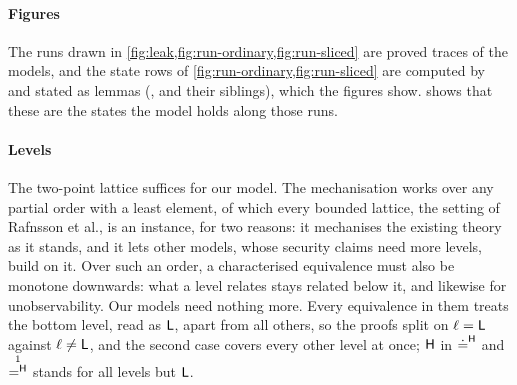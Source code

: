 \paragraph{Figures} The runs drawn in \cref{fig:leak,fig:run-ordinary,fig:run-sliced}
are proved traces of the models, and the state rows of
\cref{fig:run-ordinary,fig:run-sliced} are computed by  and
stated as lemmas (,  and their
siblings), which the figures show.  shows
that these are the states the model holds along those runs.

\paragraph{Levels} The two-point lattice suffices for our model. The
mechanisation works over any partial order with a least element, of which every
bounded lattice, the setting of Rafnsson et al., is an instance, for two reasons: it mechanises the existing theory as it
stands, and it lets other models, whose security claims need more levels, build on
it. Over such an order, a characterised equivalence must also be monotone downwards: what
a level relates stays related below it, and likewise for unobservability. Our models
need nothing more. Every equivalence in them treats the bottom level, read as $\mathsf{L}$,
apart from all others, so the proofs split on $\ell = \mathsf{L}$ against $\ell \neq \mathsf{L}$,
and the second case covers every other level at once; $\mathsf{H}$ in
${\doteq^{\mathsf{H}}}$ and $\one^\Hi$ stands for all levels but $\mathsf{L}$.
